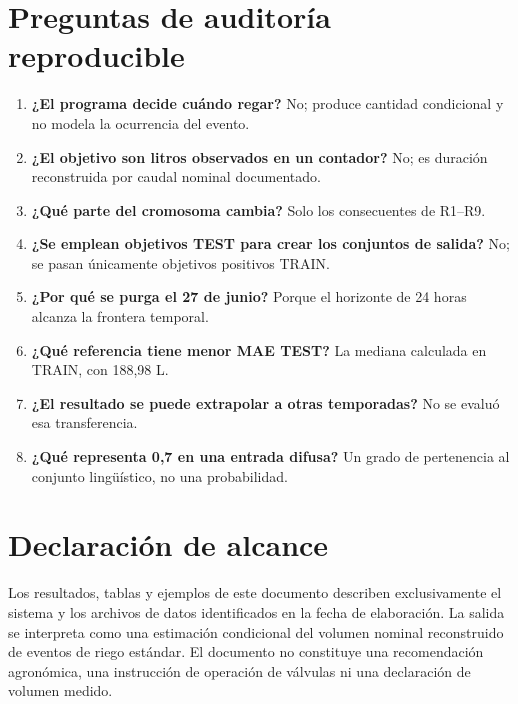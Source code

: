 \documentclass[11pt,letterpaper]{article}
\begin{document}
\section{Preguntas de auditoría reproducible}
\begin{enumerate}
  \item \textbf{¿El programa decide cuándo regar?} No; produce cantidad condicional y no modela la ocurrencia del evento.
  \item \textbf{¿El objetivo son litros observados en un contador?} No; es duración reconstruida por caudal nominal documentado.
  \item \textbf{¿Qué parte del cromosoma cambia?} Solo los consecuentes de R1--R9.
  \item \textbf{¿Se emplean objetivos TEST para crear los conjuntos de salida?} No; se pasan únicamente objetivos positivos TRAIN.
  \item \textbf{¿Por qué se purga el 27 de junio?} Porque el horizonte de 24 horas alcanza la frontera temporal.
  \item \textbf{¿Qué referencia tiene menor MAE TEST?} La mediana calculada en TRAIN, con 188,98 L.
  \item \textbf{¿El resultado se puede extrapolar a otras temporadas?} No se evaluó esa transferencia.
  \item \textbf{¿Qué representa 0,7 en una entrada difusa?} Un grado de pertenencia al conjunto lingüístico, no una probabilidad.
\end{enumerate}

\section*{Declaración de alcance}
Los resultados, tablas y ejemplos de este documento describen exclusivamente el sistema y los archivos de datos identificados en la fecha de elaboración. La salida se interpreta como una estimación condicional del volumen nominal reconstruido de eventos de riego estándar. El documento no constituye una recomendación agronómica, una instrucción de operación de válvulas ni una declaración de volumen medido.
\end{document}
